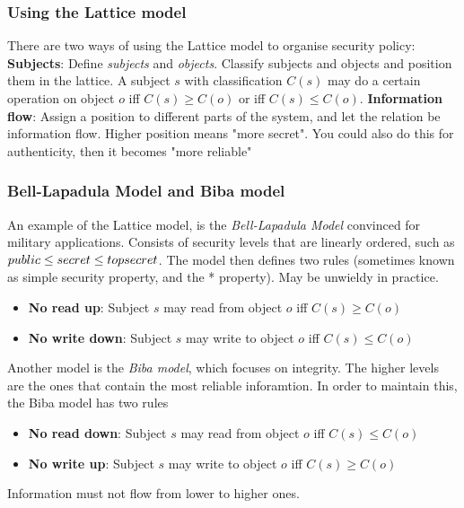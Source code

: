     \begin{frame}
        \frametitle{Using the Lattice model}
            There are two ways of using the Lattice model to organise security policy: 
            \textbf{Subjects}: Define \textit{subjects} and \textit{objects}. Classify subjects and objects and position them in the lattice. A subject $s$ with classification $C(s)$ may do a certain operation on object $o$ iff $C(s) \geq C(o)$ or iff $C(s) \leq C(o)$. 
            \textbf{Information flow}: Assign a position to different parts of the system, and let the relation be information flow. Higher position means "more secret". You could also do this for authenticity, then it becomes "more reliable"    
    \end{frame}
    \begin{frame}
        \frametitle{Bell-Lapadula Model and Biba model}
            An example of the Lattice model, is the \textit{Bell-Lapadula Model} convinced for military applications. 
            Consists of security levels that are linearly ordered, such as $public \leq secret \leq top\-secret$. The model then defines two rules (sometimes known as simple security property, and the * property). May be unwieldy in practice.
            \begin{itemize}
                \item \textbf{No read up}: Subject $s$ may read from object $o$ iff $C(s) \geq C(o)$
                \item \textbf{No write down}: Subject $s$ may write to object $o$ iff $C(s) \leq C(o)$
            \end{itemize}
            Another model is the \textit{Biba model}, which focuses on integrity. The higher levels are the ones that contain the most reliable inforamtion. In order to maintain this, the Biba model has two rules
            \begin{itemize}
                \item \textbf{No read down}: Subject $s$ may read from object $o$ iff $C(s) \leq C(o)$
                \item \textbf{No write up}: Subject $s$ may write to object $o$ iff $C(s) \geq C(o)$
            \end{itemize}
            Information must not flow from lower to higher ones.     
    \end{frame}

